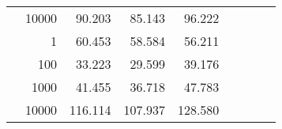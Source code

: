 \begin{table}
\begin{tabular}{rrrrrrrrr}
	            
					 &  
					 
					\multirow{ 1 }{*}{ 10000 } &
					
						
							    
							    
	                           90.203 & 85.143 & 96.222  \\
	                
	            
	        
				\noalign{\smallskip}\hline
				\multirow{ 4 }{*}{ 2000000 } &
				
					
					 
					\multirow{ 1 }{*}{ 1 } &
					
						
							    
							    
	                           60.453 & 58.584 & 56.211  \\
	                
	            
					 &  
					 
					\multirow{ 1 }{*}{ 100 } &
					
						
							    
							    
	                           33.223 & 29.599 & 39.176  \\
	                
	            
					 &  
					 
					\multirow{ 1 }{*}{ 1000 } &
					
						
							    
							    
	                           41.455 & 36.718 & 47.783  \\
	                
	            
					 &  
					 
					\multirow{ 1 }{*}{ 10000 } &
					
						
							    
							    
	                           116.114 & 107.937 & 128.580  \\
	                
	            
	        

\hline

\end{tabular}
\end{table}
\clearpage


	    
	
	    

